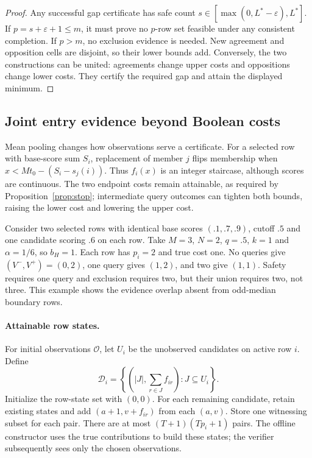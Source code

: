 \begin{proof}
Any successful gap certificate has safe count $s\in[\max(0,L^*-\varepsilon),L^*]$. If $p=s+\varepsilon+1\le m$, it must prove no $p$-row set feasible under any consistent completion. If $p>m$, no exclusion evidence is needed. New agreement and opposition cells are disjoint, so their lower bounds add. Conversely, the two constructions can be united: agreements change upper costs and oppositions change lower costs. They certify the required gap and attain the displayed minimum.
\end{proof}

\subsection{Joint entry evidence beyond Boolean costs}
\label{app:joint-evidence}
Mean pooling changes how observations serve a certificate. For a selected row with base-score sum $S_i$, replacement of member $j$ flips membership when $x<Mt_0-(S_i-s_j(i))$. Thus $f_i(x)$ is an integer staircase, although scores are continuous. The two endpoint costs remain attainable, as required by Proposition~\ref{prop:stop}; intermediate query outcomes can tighten both bounds, raising the lower cost and lowering the upper cost.

Consider two selected rows with identical base scores $(.1,.7,.9)$, cutoff $.5$ and one candidate scoring $.6$ on each row. Take $M=3$, $N=2$, $q=.5$, $k=1$ and $\alpha=1/6$, so $b_H=1$. Each row has $p_i=2$ and true cost one. No queries give $(V^-,V^+)=(0,2)$, one query gives $(1,2)$, and two give $(1,1)$. Safety requires one query and exclusion requires two, but their union requires two, not three. This example shows the evidence overlap absent from odd-median boundary rows.

\paragraph{Attainable row states.}
For initial observations $\mathcal O$, let $U_i$ be the unobserved candidates on active row $i$. Define
\[
 \mathcal D_i=\left\{\left(|J|,\sum_{r\in J}f_{ir}\right):J\subseteq U_i\right\}.
\]
Initialize the row-state set with $(0,0)$. For each remaining candidate, retain existing states and add $(a+1,v+f_{ir})$ from each $(a,v)$. Store one witnessing subset for each pair. There are at most $(T+1)(Tp_i+1)$ pairs. The offline constructor uses the true contributions to build these states; the verifier subsequently sees only the chosen observations.

